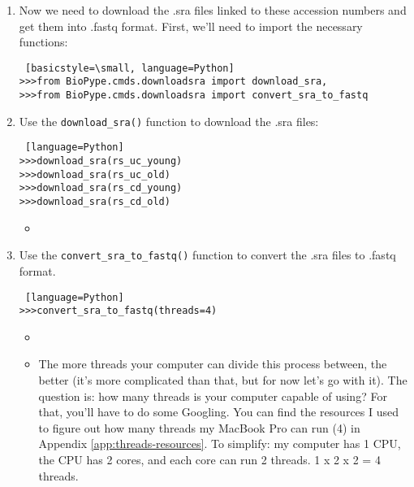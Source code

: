 \begin{enumerate}
            
            \item Now we need to download the .sra files linked to these accession numbers and get them into .fastq format. First, we'll need to import the necessary functions:
            \begin{lstlisting} [basicstyle=\small, language=Python]
>>>from BioPype.cmds.downloadsra import download_sra,
>>>from BioPype.cmds.downloadsra import convert_sra_to_fastq
            \end{lstlisting}
            
            
            \item Use the \verb|download_sra()| function to download the .sra files:
            \begin{lstlisting} [language=Python]
>>>download_sra(rs_uc_young)
>>>download_sra(rs_uc_old)
>>>download_sra(rs_cd_young)
>>>download_sra(rs_cd_old)
            \end{lstlisting}
                \begin{itemize}
                \item {}
                \end{itemize}
            
            
            \item {} 
            Use the \verb|convert_sra_to_fastq()| function to convert the .sra files to .fastq format.
            
            \begin{lstlisting} [language=Python]
>>>convert_sra_to_fastq(threads=4)
            \end{lstlisting}
                \begin{itemize}
                \item {}
                \item The more threads your computer can divide this process between, the better (it's more complicated than that, but for now let's go with it). The question is: how many threads is your computer capable of using? For that, you'll have to do some Googling. You can find the resources I used to figure out how many threads my MacBook Pro can run (4) in Appendix \ref{app:threads-resources}. To simplify: my computer has 1 CPU, the CPU has 2 cores, and each core can run 2 threads. 1 x 2 x 2 = 4 threads.
                \end{itemize}            
                                    
        \end{enumerate}
        
